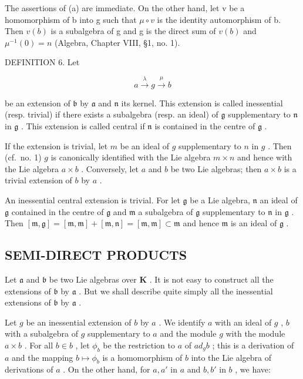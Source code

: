 The assertions of (a) are immediate. On the other hand, let v be a homomorphism of b into g such that \(\mu \circ v\) is the identity automorphism of b. Then \(v(b)\) is a subalgebra of g and g is the direct sum of \(v(b)\) and \(\mu^{-1}(0) = n\) (Algebra, Chapter VIII, §1, no. 1).

DEFINITION 6. Let

\[
a \xrightarrow {\lambda} g \xrightarrow {\mu} b
\]

be an extension of \(\mathfrak{b}\) by \(\mathfrak{a}\) and \(\mathfrak{n}\) its kernel. This extension is called inessential (resp. trivial) if there exists a subalgebra (resp. an ideal) of \(\mathfrak{g}\) supplementary to \(\mathfrak{n}\) in \(\mathfrak{g}\) . This extension is called central if \(\mathfrak{n}\) is contained in the centre of \(\mathfrak{g}\) .

If the extension is trivial, let \(m\) be an ideal of \(g\) supplementary to \(n\) in \(g\) . Then (cf.~no. 1) \(g\) is canonically identified with the Lie algebra \(m \times n\) and hence with the Lie algebra \(a \times b\) . Conversely, let \(a\) and \(b\) be two Lie algebras; then \(a \times b\) is a trivial extension of \(b\) by \(a\) .

An inessential central extension is trivial. For let \(\mathfrak{g}\) be a Lie algebra, \(\mathfrak{n}\) an ideal of \(\mathfrak{g}\) contained in the centre of \(\mathfrak{g}\) and \(\mathfrak{m}\) a subalgebra of \(\mathfrak{g}\) supplementary to \(\mathfrak{n}\) in \(\mathfrak{g}\) . Then \([\mathfrak{m},\mathfrak{g}] = [\mathfrak{m},\mathfrak{m}] + [\mathfrak{m},\mathfrak{n}] = [\mathfrak{m},\mathfrak{m}] \subset \mathfrak{m}\) and hence \(\mathfrak{m}\) is an ideal of \(\mathfrak{g}\) .

\subsection{SEMI-DIRECT PRODUCTS}

Let \(\mathfrak{a}\) and \(\mathfrak{b}\) be two Lie algebras over \(\mathbf{K}\) . It is not easy to construct all the extensions of \(\mathfrak{b}\) by \(\mathfrak{a}\) . But we shall describe quite simply all the inessential extensions of \(\mathfrak{b}\) by \(\mathfrak{a}\) .

Let \(g\) be an inessential extension of \(b\) by \(a\) . We identify \(a\) with an ideal of \(g\) , \(b\) with a subalgebra of \(g\) supplementary to \(a\) and the module \(g\) with the module \(a \times b\) . For all \(b \in b\) , let \(\phi_b\) be the restriction to \(a\) of \(ad_g b\) ; this is a derivation of \(a\) and the mapping \(b \mapsto \phi_b\) is a homomorphism of \(b\) into the Lie algebra of derivations of \(a\) . On the other hand, for \(a, a'\) in \(a\) and \(b, b'\) in \(b\) , we have:

